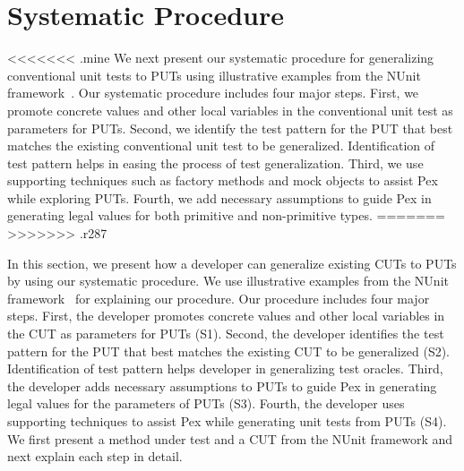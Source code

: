 \section{Systematic Procedure}
\label{sec:procedure}
<<<<<<< .mine
We next present our systematic procedure for generalizing conventional unit tests to PUTs using illustrative examples from the NUnit framework~\cite{nunit}. Our systematic procedure includes four major steps. First, we promote concrete values and other local variables in the conventional unit test as parameters for PUTs. Second, we identify the test pattern for the PUT that best matches the existing conventional unit test to be generalized. Identification of test pattern helps in easing the process of test generalization. Third, we use supporting techniques such as factory methods and mock objects to assist Pex while exploring PUTs. Fourth, we add necessary assumptions to guide Pex in generating legal values for both primitive and non-primitive types. 
=======
>>>>>>> .r287

In this section, we present how a developer can generalize existing CUTs to PUTs by using our systematic procedure. We use illustrative examples from the NUnit framework~\cite{nunit} for explaining our procedure. Our procedure includes four major steps. First, the developer promotes concrete values and other local variables in the CUT as parameters for PUTs (S1). Second, the developer identifies the test pattern for the PUT that best matches the existing CUT to be generalized (S2). Identification of test pattern helps developer in generalizing test oracles. Third, the developer adds necessary assumptions to PUTs to guide Pex in generating legal values for the parameters of PUTs (S3). Fourth, the developer uses supporting techniques to assist Pex while generating unit tests from PUTs (S4). We first present a method under test and a CUT from the NUnit framework and next explain each step in detail.


